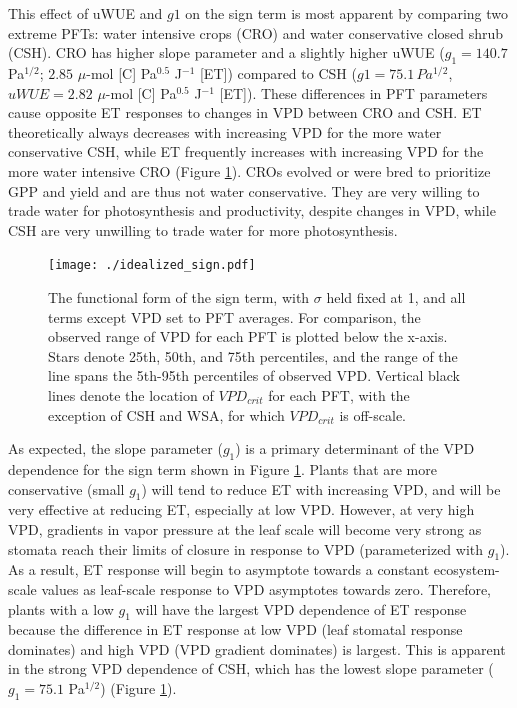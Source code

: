 This effect of uWUE and $g1$ on the sign term is most apparent by
comparing two extreme PFTs: water intensive crops (CRO) and water
conservative closed shrub (CSH). CRO has higher slope parameter and a
slightly higher uWUE ($g_1 = 140.7$ Pa$^{1/2}$; $2.85$ $\mu$-mol [C]
Pa$^{0.5}$ J$^{-1}$ [ET]) compared to CSH ($g1 = 75.1 \, Pa^{1/2}$,
$uWUE=2.82$ $\mu$-mol [C] Pa$^{0.5}$ J$^{-1}$ [ET]). These differences
in PFT parameters cause opposite ET responses to changes in VPD
between CRO and CSH. ET theoretically always decreases with increasing
VPD for the more water conservative CSH, while ET frequently increases
with increasing VPD for the more water intensive CRO (Figure
\ref{idealized_sign}). CROs evolved or were bred to prioritize GPP and
yield and are thus not water conservative. They are very willing to
trade water for photosynthesis and productivity, despite changes in
VPD, while CSH are very unwilling to trade water for more
photosynthesis.

\begin{figure}
  \centering \texttt{[image: ./idealized\_sign.pdf]}
  \caption{The functional form of the sign term, with $\sigma$ held
    fixed at 1, and all terms except VPD set to PFT averages. For
    comparison, the observed range of VPD for each PFT is plotted
    below the x-axis. Stars denote 25th, 50th, and 75th percentiles,
    and the range of the line spans the 5th-95th percentiles of
    observed VPD. Vertical black lines denote the location of
    $VPD_{crit}$ for each PFT, with the exception of CSH and WSA, for which
    $VPD_{crit}$ is off-scale.}
  \label{idealized_sign}
\end{figure}


As expected, the slope parameter ($g_1$) is a primary determinant of
the VPD dependence for the sign term shown in Figure
\ref{idealized_sign}. Plants that are more conservative (small $g_1$)
will tend to reduce ET with increasing VPD, and will be very effective
at reducing ET, especially at low VPD. However, at very high VPD,
gradients in vapor pressure at the leaf scale will become very strong
as stomata reach their limits of closure in response to VPD
(parameterized with $g_1$). As a result, ET response will begin to
asymptote towards a constant ecosystem-scale values as leaf-scale
response to VPD asymptotes towards zero.  Therefore, plants with a low
$g_1$ will have the largest VPD dependence of ET response because the
difference in ET response at low VPD (leaf stomatal response
dominates) and high VPD (VPD gradient dominates) is largest. This is
apparent in the strong VPD dependence of CSH, which has the lowest
slope parameter ($g_1=75.1$ Pa$^{1/2}$) (Figure \ref{idealized_sign}).

